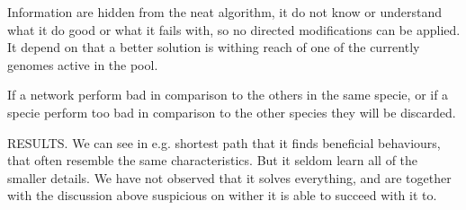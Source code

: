 Information are hidden from the neat algorithm, it do not know or understand what it do good or what it fails with, so no directed modifications can be applied. It depend on that a better solution is withing reach of one of the currently genomes active in the pool.

If a network perform bad in comparison to the others in the same specie, or if a specie perform too bad in comparison to the other species they will be discarded.













RESULTS. We can see in e.g. shortest path that it finds beneficial behaviours, that often resemble the same characteristics. But it seldom learn all of the smaller details. We have not observed that it solves everything, and are together with the discussion above suspicious on wither it is able to succeed with it to.

